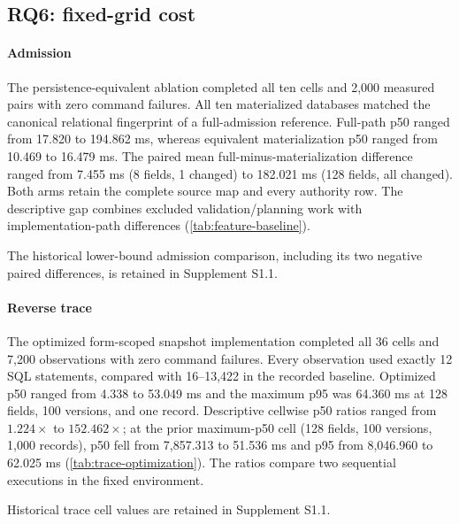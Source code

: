 \subsection{RQ6: fixed-grid cost}

\paragraph{Admission}
The persistence-equivalent ablation completed all ten cells and 2,000 measured pairs with zero command failures. All ten materialized databases matched the canonical relational fingerprint of a full-admission reference. Full-path p50 ranged from 17.820 to 194.862 ms, whereas equivalent materialization p50 ranged from 10.469 to 16.479 ms. The paired mean full-minus-materialization difference ranged from 7.455 ms (8 fields, 1 changed) to 182.021 ms (128 fields, all changed). Both arms retain the complete source map and every authority row. The descriptive gap combines excluded validation/planning work with implementation-path differences (\cref{tab:feature-baseline}).



The historical lower-bound admission comparison, including its two negative paired differences, is retained in Supplement S1.1.

\paragraph{Reverse trace}
The optimized form-scoped snapshot implementation completed all 36 cells and 7,200 observations with zero command failures. Every observation used exactly 12 SQL statements, compared with 16--13,422 in the recorded baseline. Optimized p50 ranged from 4.338 to 53.049 ms and the maximum p95 was 64.360 ms at 128 fields, 100 versions, and one record. Descriptive cellwise p50 ratios ranged from $1.224\times$ to $152.462\times$; at the prior maximum-p50 cell (128 fields, 100 versions, 1,000 records), p50 fell from 7,857.313 to 51.536 ms and p95 from 8,046.960 to 62.025 ms (\cref{tab:trace-optimization}). The ratios compare two sequential executions in the fixed environment.



Historical trace cell values are retained in Supplement S1.1.

